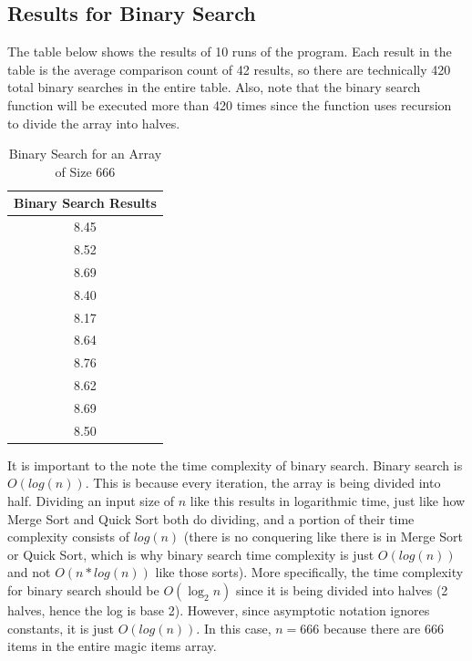 \documentclass[letterpaper, 10pt]{article}
\begin{document}
\subsection{Results for Binary Search}
\noindent
The table below shows the results of 10 runs of the program. Each result in the table is the average comparison count of 42 results, so there are technically 420 total binary searches in the entire table. Also, note that the binary search function will be executed more than 420 times since the function uses recursion to divide the array into halves.

\begin{table}[H]
    \centering
    \begin{tabular}{|c|}
        \hline
        \textbf{Binary Search Results} \\ \hline
        8.45 \\ 
        8.52 \\ 
        8.69 \\ 
        8.40 \\ 
        8.17 \\ 
        8.64 \\ 
        8.76 \\ 
        8.62 \\ 
        8.69 \\ 
        8.50 \\ \hline
    \end{tabular}
    \caption{Binary Search for an Array of Size 666}
    \label{tab:tab2}
\end{table}

\noindent
It is important to the note the time complexity of binary search. Binary search is $O(log(n))$. This is because every iteration, the array is being divided into half. Dividing an input size of $n$ like this results in logarithmic time, just like how Merge Sort and Quick Sort both do dividing, and a portion of their time complexity consists of $log(n)$ (there is no conquering like there is in Merge Sort or Quick Sort, which is why binary search time complexity is just $O(log(n))$ and not $O(n * log(n))$ like those sorts). More specifically, the time complexity for binary search should be $O(\log_2 n)$ since it is being divided into halves (2 halves, hence the log is base 2). However, since asymptotic notation ignores constants, it is just $O(log(n))$. In this case, $n = 666$ because there are 666 items in the entire magic items array. 

\vspace{1em}
\end{document}
